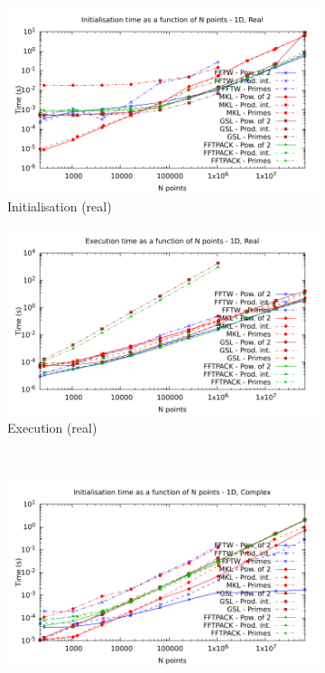 \documentclass[12pt, a4paper]{article} \setlength{\textheight}{24cm}
\begin{document}
\begin{figure}[H]
  \centering
  \begin{subfigure}{.5\textwidth}
    \centering
    \includegraphics[width=.9\linewidth]{graphs/1d-init-r.pdf}
    \caption{Initialisation (real)}
    \label{1DRI}
  \end{subfigure}%
  \begin{subfigure}{.5\textwidth} \centering
    \includegraphics[width=.9\linewidth]{graphs/1d-exec-r.pdf}
    \caption{Execution (real)}
    \label{1DR}
  \end{subfigure}\\
  \begin{subfigure}{.5\textwidth}
    \centering
    \includegraphics[width=.9\linewidth]{graphs/1d-init-c.pdf}

\end{subfigure}
\end{figure}
\end{document}
